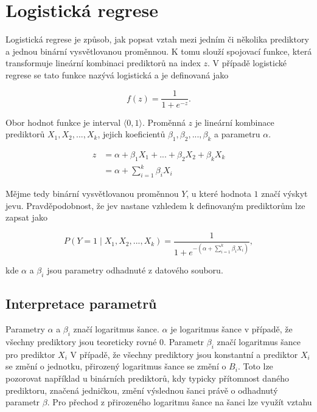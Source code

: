 \newpage
\section{Logistická regrese}
Logistická regrese je způsob, jak popsat vztah mezi jedním či několika prediktory a jednou binární vysvětlovanou 
proměnnou. K tomu slouží spojovací funkce, která transformuje lineární kombinaci prediktorů na index $z$. V případě
logistické regrese se tato funkce nazývá logistická a je definovaná jako

\begin{equation}
    \label{eq:logisticka_funkce}
    f(z) = \frac{1}{1 + e^{-z}}.
\end{equation}

Obor hodnot funkce je interval $\langle 0, 1 \rangle$. Proměnná $z$ je lineární kombinace prediktorů  $X_1, X_2, ..., X_k$, 
jejich koeficientů $\beta_1, \beta_2, ..., \beta_k$ a parametru $\alpha$.

\begin{equation}
    \label{eq:linearni_kombinace_z}
    \begin{split}
        z &= \alpha + \beta_1 X_1 + ... + \beta_2 X_2 +\beta_k X_k \\
          &= \alpha + \sum_{i=1}^k \beta_i X_i
    \end{split}
\end{equation}

Mějme tedy binární vysvětlovanou proměnnou $Y$, u které hodnota $1$ značí výskyt jevu. Pravděpodobnost, že jev nastane
vzhledem k definovaným prediktorům lze zapsat jako

\begin{equation}
    \label{eq:pravdepodobnost_y}
    P(Y = 1 \mid X_1, X_2, ..., X_k) = \frac{1}{1 + e^{- \left( \alpha + \sum_{i=1}^k \beta_i X_i \right) }},
\end{equation}

kde $\alpha$ a $\beta_i$ jsou parametry odhadnuté z datového souboru. \cite{Kleinbaum2010}

\subsection{Interpretace parametrů}
Parametry $\alpha$ a $\beta_i$ značí logaritmus šance. $\alpha$ je logaritmus šance v případě, že všechny prediktory
jsou teoreticky rovné $0$. Parametr $\beta_i$ značí logaritmus šance pro prediktor $X_i$
V případě, že všechny prediktory jsou konstantní a prediktor $X_i$ se změní o jednotku, přirozený logaritmus
šance se změní o $B_i$. Toto lze pozorovat například u binárních prediktorů, kdy typicky přítomnost
daného prediktoru, značená jedničkou, změní výslednou šanci právě o odhadnutý parametr $\beta$.
Pro přechod z přirozeného logaritmu šance na šanci lze využít vztahu

